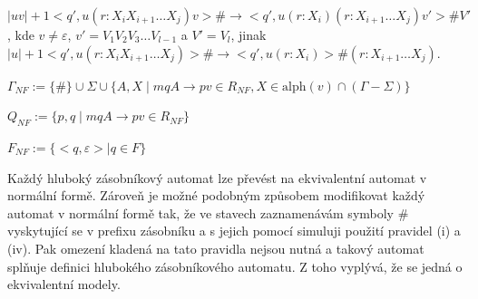 \begin{Alg}
\begin{list}{}{\setlength\parsep{0cm} \setlength\itemsep{0cm} \setlength\leftmargin{1em}}
  \subsubitem $|uv|+1 <q',u(r : X_i X_{i+1} \dots X_j)v> \# \rightarrow <q',u(r : X_i) (r: X_{i+1} \dots X_j)v'>\# V' $,
  \subsubitem kde $v \ne \varepsilon$, $v' = V_1 V_2 V_3 \dots V_{l-1}$ a $V'=V_l$, jinak \medskip
  \subsubitem $|u|+1 <q',u(r : X_i X_{i+1} \dots X_j)> \# \rightarrow <q',u(r : X_i)>\# (r: X_{i+1} \dots X_j)$.\bigskip

  \item ${\Gamma}_{NF} :=\{\#\} \cup \Sigma \cup \{A, X \mid mqA \rightarrow pv \in R_{NF}, X \in \mathrm{alph}(v) \cap (\Gamma - \Sigma) \}$
  \item $Q_{NF} := \{p,q \mid mqA \rightarrow pv \in R_{NF}\} $
  \item $F_{NF} := \{<q, \varepsilon> \mid  q \in F \}$


\end{list}
\end{Alg}

Každý hluboký zásobníkový automat lze převést na ekvivalentní automat v normální formě. Zároveň je možné podobným způsobem modifikovat každý automat v normální formě tak, že ve stavech zaznamenávám symboly $\#$ vyskytující se v prefixu zásobníku a s jejich pomocí simuluji použití pravidel (i) a (iv). Pak omezení kladená na tato pravidla nejsou nutná a takový automat splňuje definici hlubokého zásobníkového automatu. Z toho vyplývá, že se jedná o ekvivalentní modely.



